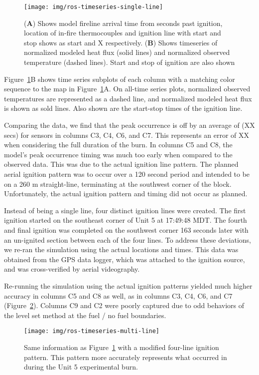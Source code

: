 \documentclass[preprints,article,accept,moreauthors,pdftex]{Definitions/mdpi}
\begin{document}
\begin{figure}[H]
\centering
 \texttt{[image: img/ros-timeseries-single-line]}
 \caption{(\textbf{A}) Shows model fireline arrival time from seconds past ignition, location of in-fire thermocouples and ignition line with start and stop shows as start and X respectively. (\textbf{B}) Shows timeseries of normalized modeled heat flux (solid lines) and normalized observed temperature (dashed lines). Start and stop of ignition are also shown\label{fig2}}
 \end{figure}

Figure~\ref{fig2}B shows time series subplots of each column with a matching color sequence to the map in Figure~\ref{fig2}A. On all-time series plots, normalized observed temperatures are represented as a dashed line, and normalized modeled heat flux is shown as sold lines. Also shown are the start-stop times of the ignition line.

Comparing the data, we find that the peak occurrence is off by an average of (XX secs) for sensors in columns C3, C4, C6, and C7. This represents an error of XX when considering the full duration of the burn. In columns C5 and C8, the model’s peak occurrence timing was much too early when compared to the observed data. This was due to the actual ignition line pattern. The planned aerial ignition pattern was to occur over a 120 second period and intended to be on a 260 m straight-line, terminating at the southwest corner of the block. Unfortunately, the actual ignition pattern and timing did not occur as planned.

Instead of being a single line, four distinct ignition lines were created. The first ignition started on the southeast corner of Unit 5 at 17:49:48 MDT. The fourth and final ignition was completed on the southwest corner 163 seconds later with an un-ignited section between each of the four lines. To address these deviations, we re-ran the simulation using the actual locations and times. This data was obtained from the GPS data logger, which was attached to the ignition source, and was cross-verified by aerial videography.

Re-running the simulation using the actual ignition patterns yielded much higher accuracy in columns C5 and C8 as well, as in columns C3, C4, C6, and C7 (Figure~\ref{fig3}). Columns C9 and C2 were poorly captured due to odd behaviors of the level set method at the fuel / no fuel boundaries.

\begin{figure}[H]
\centering
 \texttt{[image: img/ros-timeseries-multi-line]}
 \caption{Same information as Figure~\ref{fig2} with a modified four-line ignition pattern. This pattern more accurately represents what occurred in during the Unit 5 experimental burn.\label{fig3}}
 \end{figure}
\end{document}
